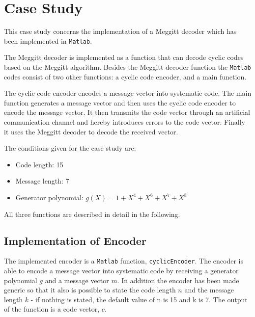 \documentclass[Main]{subfiles}
\begin{document}
\section{Case Study}

%
%
%

This case study concerns the implementation of a Meggitt decoder which has been implemented in \texttt{Matlab}. 

The Meggitt decoder is implemented as a function that can decode cyclic codes based on the Meggitt algorithm. Besides the Meggitt decoder function the \texttt{Matlab} codes consist of two other functions: a cyclic code encoder, and a main function.

The cyclic code encoder encodes a message vector into systematic code. The main function generates a message vector and then uses the cyclic code encoder to encode the message vector. It then transmits the code vector through an artificial communication channel and hereby introduces errors to the code vector. Finally it uses the Meggitt decoder to decode the received vector. 

The conditions given for the case study are: 
\begin{itemize} \itemsep0pt \parskip0pt 
\item Code length: 15
\item Message length: 7
\item Generator polynomial: $g(X)=1+X^4+X^6+X^7+X^8$
\end{itemize} 

All three functions are described in detail in the following. 











\subsection{Implementation of Encoder}
\label{sec:ImplementEncoder}
The implemented encoder is a \texttt{Matlab} function, \texttt{cyclicEncoder}. The encoder is able to encode a message vector into systematic code by receiving a generator polynomial $g$ and a message vector $m$. In addition the encoder has been made generic so that it also is possible to state the code length $n$ and the message length $k$ - if nothing is stated, the default value of n is 15 and k is 7. The output of the function is a code vector, $c$. 
\end{document}
